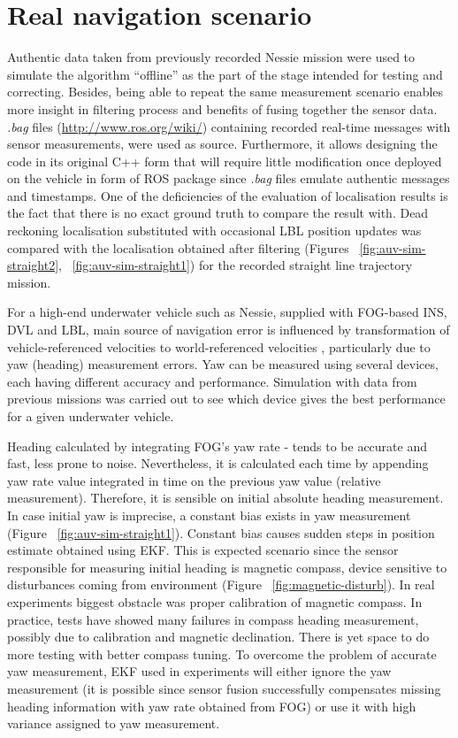 \section{Real navigation scenario} \label{sec:real-scenario}
Authentic data taken from previously recorded Nessie mission were used to simulate the algorithm ``offline'' as the part of the stage intended for testing and correcting. Besides, being able to repeat the same measurement scenario enables more insight in filtering process and benefits of fusing together the sensor data. \textit{.bag} files (\url{http://www.ros.org/wiki/}) containing recorded real-time messages with sensor measurements, were used as source. Furthermore, it allows designing the code in its original C++ form that will require little modification once deployed on the vehicle in form of ROS package since \textit{.bag} files emulate authentic messages and timestamps. One of the deficiencies of the evaluation of localisation results is the fact that there is no exact ground truth to compare the result with. Dead reckoning localisation substituted with occasional LBL position updates was compared with the localisation obtained after filtering (Figures ~\ref{fig:auv-sim-straight2}, ~\ref{fig:auv-sim-straight1}) for the recorded straight line trajectory mission. 

For a high-end underwater vehicle such as Nessie, supplied with FOG-based INS, DVL and LBL, main source of navigation error is influenced by transformation of vehicle-referenced velocities to world-referenced velocities \cite{bahr08}, particularly due to yaw (heading) measurement errors. Yaw can be measured using several devices, each having different accuracy and performance. Simulation with data from previous missions was carried out to see which device gives the best performance for a given underwater vehicle. 

Heading calculated by integrating FOG's yaw rate - tends to be accurate and fast, less prone to noise. Nevertheless, it is calculated each time by appending yaw rate value integrated in time on the previous yaw value (relative measurement). Therefore, it is sensible on initial absolute heading measurement. In case initial yaw is imprecise, a constant bias exists in yaw measurement (Figure ~\ref{fig:auv-sim-straight1}). Constant bias causes sudden steps in position estimate obtained using EKF. This is expected scenario since the sensor responsible for measuring initial heading is magnetic compass, device sensitive to disturbances coming from environment (Figure ~\ref{fig:magnetic-disturb}). In real experiments biggest obstacle was proper calibration of magnetic compass. In practice, tests have showed many failures in compass heading measurement, possibly due to calibration and magnetic declination. There is yet space to do more testing with better compass tuning. To overcome the problem of accurate yaw measurement, EKF used in experiments will either ignore the yaw measurement (it is possible since sensor fusion successfully compensates missing heading information with yaw rate obtained from FOG) or use it with high variance assigned to yaw measurement. 

